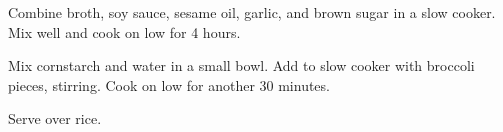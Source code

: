 \begin{method}
  Combine broth, soy sauce, sesame oil, garlic,
  and brown sugar in a slow cooker.
  Mix well and cook on low for 4 hours.

  Mix cornstarch and water in a small bowl.
  Add to slow cooker with broccoli pieces, stirring.
  Cook on low for another 30 minutes.

  Serve over rice.
\end{method}
